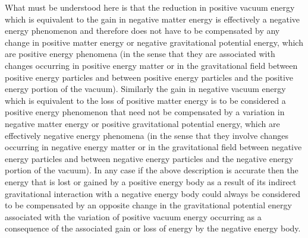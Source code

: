 \documentclass[notitlepage,12pt]{report}
\begin{document}
What must be understood here is that the reduction in positive vacuum energy which is equivalent to the gain in negative matter energy is effectively a negative energy phenomenon and therefore does not have to be compensated by any change in positive matter energy or negative gravitational potential energy, which are positive energy phenomena (in the sense that they are associated with changes occurring in positive energy matter or in the gravitational field between positive energy particles and between positive energy particles and the positive energy portion of the vacuum). Similarly the gain in negative vacuum energy which is equivalent to the loss of positive matter energy is to be considered a positive energy phenomenon that need not be compensated by a variation in negative matter energy or positive gravitational potential energy, which are effectively negative energy phenomena (in the sense that they involve changes occurring in negative energy matter or in the gravitational field between negative energy particles and between negative energy particles and the negative energy portion of the vacuum). In any case if the above description is accurate then the energy that is lost or gained by a positive energy body as a result of its indirect gravitational interaction with a negative energy body could always be considered to be compensated by an opposite change in the gravitational potential energy associated with the variation of positive vacuum energy occurring as a consequence of the associated gain or loss of energy by the negative energy body.
\end{document}
